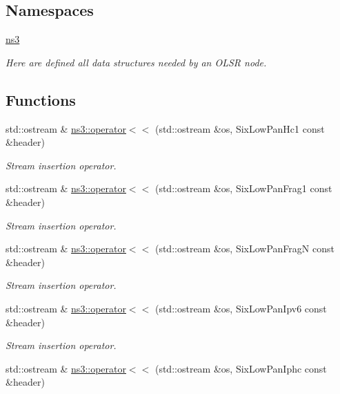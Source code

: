 \subsection*{Namespaces}
\begin{DoxyCompactItemize}
\item 
 \hyperlink{namespacens3}{ns3}
\begin{DoxyCompactList}\small\item\em Here are defined all data structures needed by an O\+L\+SR node. \end{DoxyCompactList}\end{DoxyCompactItemize}
\subsection*{Functions}
\begin{DoxyCompactItemize}
\item 
std\+::ostream \& \hyperlink{namespacens3_a3206dad5b9c2d4d8bfae82c0a4eef647}{ns3\+::operator$<$$<$} (std\+::ostream \&os, Six\+Low\+Pan\+Hc1 const \&header)
\begin{DoxyCompactList}\small\item\em Stream insertion operator. \end{DoxyCompactList}\item 
std\+::ostream \& \hyperlink{namespacens3_a0d19c4dfea04a3666706bfda9975e2bf}{ns3\+::operator$<$$<$} (std\+::ostream \&os, Six\+Low\+Pan\+Frag1 const \&header)
\begin{DoxyCompactList}\small\item\em Stream insertion operator. \end{DoxyCompactList}\item 
std\+::ostream \& \hyperlink{namespacens3_acc02db5ba7ef3fd811d8f37b023ab3e5}{ns3\+::operator$<$$<$} (std\+::ostream \&os, Six\+Low\+Pan\+FragN const \&header)
\begin{DoxyCompactList}\small\item\em Stream insertion operator. \end{DoxyCompactList}\item 
std\+::ostream \& \hyperlink{namespacens3_a7a1fc9b56c1a8140d9d819229d7a2f7c}{ns3\+::operator$<$$<$} (std\+::ostream \&os, Six\+Low\+Pan\+Ipv6 const \&header)
\begin{DoxyCompactList}\small\item\em Stream insertion operator. \end{DoxyCompactList}\item 
std\+::ostream \& \hyperlink{namespacens3_a22c6d875c65b3f803c4ba5a02e35db5b}{ns3\+::operator$<$$<$} (std\+::ostream \&os, Six\+Low\+Pan\+Iphc const \&header)

\end{DoxyCompactItemize}

